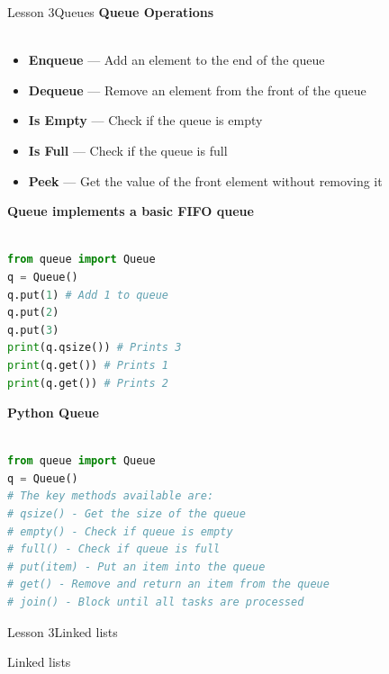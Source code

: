 \documentclass[aspectratio=1610]{beamer}
\begin{document}
\begin{frame}{Lesson 3}{Queues}
\LARGE
\textbf{Queue Operations}\\~\\
\Large
\begin{itemize}
\item \textbf{Enqueue} — Add an element to the end of the queue
\item \textbf{Dequeue} — Remove an element from the front of the queue
\item \textbf{Is Empty} — Check if the queue is empty
\item \textbf{Is Full} — Check if the queue is full
\item \textbf{Peek} — Get the value of the front element without removing it
\end{itemize}
\end{frame}




\begin{frame}[fragile]
\Large
\textbf{Queue implements a basic FIFO queue}\\~\\
\begin{lstlisting}[language=Python]
from queue import Queue
q = Queue()
q.put(1) # Add 1 to queue
q.put(2)
q.put(3)
print(q.qsize()) # Prints 3
print(q.get()) # Prints 1
print(q.get()) # Prints 2
\end{lstlisting}
\end{frame}



\begin{frame}[fragile]
\Large
\textbf{Python Queue}\\~\\
\begin{lstlisting}[language=Python]
from queue import Queue
q = Queue()
# The key methods available are:
# qsize() - Get the size of the queue
# empty() - Check if queue is empty
# full() - Check if queue is full
# put(item) - Put an item into the queue
# get() - Remove and return an item from the queue
# join() - Block until all tasks are processed
\end{lstlisting}
\end{frame}







\begin{frame}{Lesson 3}{Linked lists}
\begin{center}
\Huge Linked lists
\end{center}
\end{frame}
\end{document}

